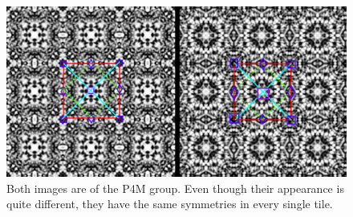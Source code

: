 \begin{figure}[!ht]
\centering
\includegraphics[width=0.9\columnwidth]{ann_images_same}
\caption{Both images are of the P4M group. Even though their appearance is quite different, they have the same symmetries in every single tile. }
\label{P4MvP4M}
\end{figure}